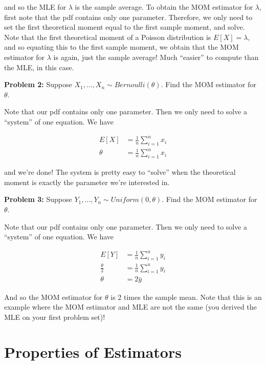 \documentclass[
  letterpaper,
  DIV=11,
  numbers=noendperiod]{scrreprt}
\begin{document}
and so the MLE for \(\lambda\) is the sample average. To obtain the MOM
estimator for \(\lambda\), first note that the pdf contains only one
parameter. Therefore, we only need to set the first theoretical moment
equal to the first sample moment, and solve. Note that the first
theoretical moment of a Poisson distribution is \(E[X] = \lambda\), and
so equating this to the first sample moment, we obtain that the MOM
estimator for \(\lambda\) is again, just the sample average! Much
``easier'' to compute than the MLE, in this case.

\textbf{Problem 2:} Suppose \(X_1, \dots, X_n \sim Bernoulli(\theta)\).
Find the MOM estimator for \(\theta\).

Note that our pdf contains only one parameter. Then we only need to
solve a ``system'' of one equation. We have

\begin{align*}
  E[X] & = \frac{1}{n} \sum_{i = 1}^n x_i \\
  \theta & = \frac{1}{n} \sum_{i = 1}^n x_i
\end{align*}

and we're done! The system is pretty easy to ``solve'' when the
theoretical moment is exactly the parameter we're interested in.

\textbf{Problem 3:} Suppose \(Y_1, \dots, Y_n \sim Uniform(0, \theta)\).
Find the MOM estimator for \(\theta\).

Note that our pdf contains only one parameter. Then we only need to
solve a ``system'' of one equation. We have

\begin{align*}
  E[Y] & = \frac{1}{n} \sum_{i = 1}^n y_i \\
  \frac{\theta}{2} & = \frac{1}{n} \sum_{i = 1}^n y_i \\
  \theta & = 2 \bar{y}
\end{align*}

And so the MOM estimator for \(\theta\) is 2 times the sample mean. Note
that this is an example where the MOM estimator and MLE are not the same
(you derived the MLE on your first problem set)!


\hypertarget{properties-of-estimators}{%
\chapter{Properties of Estimators}\label{properties-of-estimators}}
\end{document}
